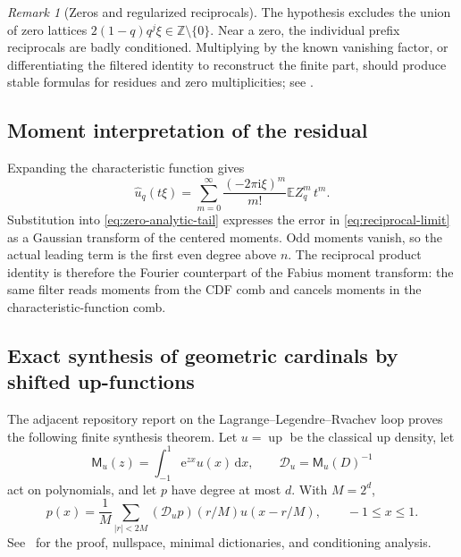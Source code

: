 \documentclass[11pt,a4paper,oneside]{article}
\theoremstyle{definition}
\theoremstyle{remark}
\newtheorem{remark}[remark]{Remark}
\newcommand{\Z}{\mathbb Z}
\newcommand{\E}{\mathbb E}
\newcommand{\dd}{\,\mathrm d}
\newcommand{\e}{\mathrm e}
\newcommand{\ii}{\mathrm i}
\newcommand{\Up}{\operatorname{up}}
\begin{document}
\begin{remark}[Zeros and regularized reciprocals]
The hypothesis excludes the union of zero lattices
$2(1-q)q^j\xi\in\Z\setminus\{0\}$.  Near a zero, the individual prefix
reciprocals are badly conditioned.  Multiplying by the known vanishing factor,
or differentiating the filtered identity to reconstruct the finite part,
should produce stable formulas for residues and zero multiplicities; see
.
\end{remark}

\subsection{Moment interpretation of the residual}

Expanding the characteristic function gives
\begin{equation}
 \widehat u_q(t\xi)
 =\sum_{m=0}^\infty
 \frac{(-2\pi\ii\xi)^m}{m!}\E Z_q^m\,t^m.
 \label{eq:uq-characteristic-series}
\end{equation}
Substitution into \eqref{eq:zero-analytic-tail} expresses the error in
\eqref{eq:reciprocal-limit} as a Gaussian transform of the centered moments.
Odd moments vanish, so the actual leading term is the first even degree above
$n$.  The reciprocal product identity is therefore the Fourier counterpart of
the Fabius moment transform: the same filter reads moments from the CDF comb
and cancels moments in the characteristic-function comb.

\subsection{Exact synthesis of geometric cardinals by shifted up-functions}
\label{sec:up-synthesis-bridge}

The adjacent repository report on the Lagrange--Legendre--Rvachev loop proves
the following finite synthesis theorem.  Let $u=\Up$ be the classical up
density, let
\begin{equation}
 \mathsf M_u(z)=\int_{-1}^1\e^{zx}u(x)\dd x,
 \qquad
 \mathscr D_u=\mathsf M_u(D)^{-1}
 \label{eq:moment-deconvolution}
\end{equation}
act on polynomials, and let $p$ have degree at most $d$.  With $M=2^d$,
\begin{equation}
 p(x)=\frac1M\sum_{|r|<2M}
 (\mathscr D_up)(r/M)u(x-r/M),
 \qquad -1\le x\le1.
 \label{eq:imported-up-synthesis}
\end{equation}
See~\cite{ProveItLagrangeLoop} for the proof, nullspace, minimal dictionaries,
and conditioning analysis.
\end{document}
